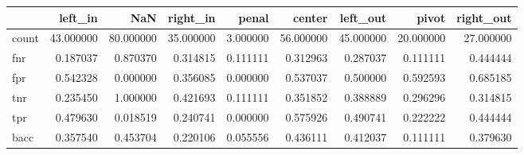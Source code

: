 \begin{tabular}{lrrrrrrrr}
\toprule
{} &    left\_in &        NaN &   right\_in &     penal &     center &   left\_out &      pivot &  right\_out \\
\midrule
count &  43.000000 &  80.000000 &  35.000000 &  3.000000 &  56.000000 &  45.000000 &  20.000000 &  27.000000 \\
fnr   &   0.187037 &   0.870370 &   0.314815 &  0.111111 &   0.312963 &   0.287037 &   0.111111 &   0.444444 \\
fpr   &   0.542328 &   0.000000 &   0.356085 &  0.000000 &   0.537037 &   0.500000 &   0.592593 &   0.685185 \\
tnr   &   0.235450 &   1.000000 &   0.421693 &  0.111111 &   0.351852 &   0.388889 &   0.296296 &   0.314815 \\
tpr   &   0.479630 &   0.018519 &   0.240741 &  0.000000 &   0.575926 &   0.490741 &   0.222222 &   0.444444 \\
bacc  &   0.357540 &   0.453704 &   0.220106 &  0.055556 &   0.436111 &   0.412037 &   0.111111 &   0.379630 \\
\bottomrule
\end{tabular}
